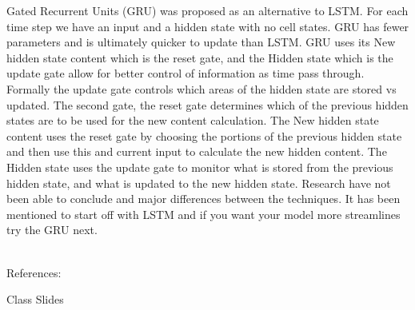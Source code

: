 \documentclass[12pt]{article}
\begin{document}
\begin{enumerate}
    Gated Recurrent Units (GRU) was proposed as an alternative to LSTM. For each time step we have an input and a hidden state with no cell states. GRU has fewer parameters and is ultimately quicker to update than LSTM. GRU uses its New hidden state content which is the reset gate, and the Hidden state which is the update gate allow for better control of information as time pass through. Formally the update gate controls which areas of the hidden state are stored vs updated. The second gate, the reset gate determines which of the previous hidden states are to be used for the new content calculation. The New hidden state content uses the reset gate by choosing the portions of the previous hidden state and then use this and current input to calculate the new hidden content. The Hidden state uses the update gate to monitor what is stored from the previous hidden state, and what is updated to the new hidden state. Research have not been able to conclude and major differences between the techniques. It has been mentioned to start off with LSTM and if you want your model more streamlines try the GRU next.\\\\

\begin{center}
References: 
\end{center}

Class Slides

\end{enumerate}
\end{document}
